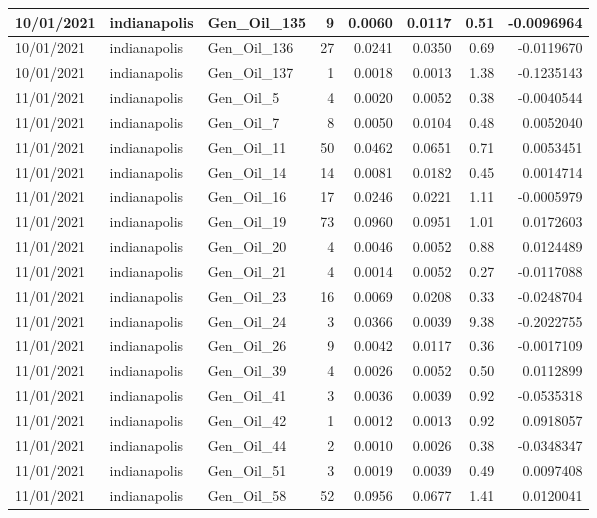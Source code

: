 \documentclass[
  letterpaper,
  DIV=11,
  numbers=noendperiod]{scrartcl}
\begin{document}
\begin{tabular}{l|l|l|r|r|r|r|r}
\hline
10/01/2021 & indianapolis & Gen\_Oil\_135 & 9 & 0.0060 & 0.0117 & 0.51 & -0.0096964\\
\hline
10/01/2021 & indianapolis & Gen\_Oil\_136 & 27 & 0.0241 & 0.0350 & 0.69 & -0.0119670\\
\hline
10/01/2021 & indianapolis & Gen\_Oil\_137 & 1 & 0.0018 & 0.0013 & 1.38 & -0.1235143\\
\hline
11/01/2021 & indianapolis & Gen\_Oil\_5 & 4 & 0.0020 & 0.0052 & 0.38 & -0.0040544\\
\hline
11/01/2021 & indianapolis & Gen\_Oil\_7 & 8 & 0.0050 & 0.0104 & 0.48 & 0.0052040\\
\hline
11/01/2021 & indianapolis & Gen\_Oil\_11 & 50 & 0.0462 & 0.0651 & 0.71 & 0.0053451\\
\hline
11/01/2021 & indianapolis & Gen\_Oil\_14 & 14 & 0.0081 & 0.0182 & 0.45 & 0.0014714\\
\hline
11/01/2021 & indianapolis & Gen\_Oil\_16 & 17 & 0.0246 & 0.0221 & 1.11 & -0.0005979\\
\hline
11/01/2021 & indianapolis & Gen\_Oil\_19 & 73 & 0.0960 & 0.0951 & 1.01 & 0.0172603\\
\hline
11/01/2021 & indianapolis & Gen\_Oil\_20 & 4 & 0.0046 & 0.0052 & 0.88 & 0.0124489\\
\hline
11/01/2021 & indianapolis & Gen\_Oil\_21 & 4 & 0.0014 & 0.0052 & 0.27 & -0.0117088\\
\hline
11/01/2021 & indianapolis & Gen\_Oil\_23 & 16 & 0.0069 & 0.0208 & 0.33 & -0.0248704\\
\hline
11/01/2021 & indianapolis & Gen\_Oil\_24 & 3 & 0.0366 & 0.0039 & 9.38 & -0.2022755\\
\hline
11/01/2021 & indianapolis & Gen\_Oil\_26 & 9 & 0.0042 & 0.0117 & 0.36 & -0.0017109\\
\hline
11/01/2021 & indianapolis & Gen\_Oil\_39 & 4 & 0.0026 & 0.0052 & 0.50 & 0.0112899\\
\hline
11/01/2021 & indianapolis & Gen\_Oil\_41 & 3 & 0.0036 & 0.0039 & 0.92 & -0.0535318\\
\hline
11/01/2021 & indianapolis & Gen\_Oil\_42 & 1 & 0.0012 & 0.0013 & 0.92 & 0.0918057\\
\hline
11/01/2021 & indianapolis & Gen\_Oil\_44 & 2 & 0.0010 & 0.0026 & 0.38 & -0.0348347\\
\hline
11/01/2021 & indianapolis & Gen\_Oil\_51 & 3 & 0.0019 & 0.0039 & 0.49 & 0.0097408\\
\hline
11/01/2021 & indianapolis & Gen\_Oil\_58 & 52 & 0.0956 & 0.0677 & 1.41 & 0.0120041\\

\end{tabular}
\end{document}
